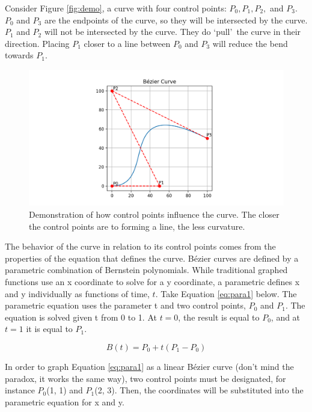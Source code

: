 \documentclass[12pt,letterpaper]{article}
\begin{document}
Consider Figure \ref{fig:demo}, a curve with four control points: $P_0, P_1, P_2,$ and $P_3$. $P_0$ and $P_3$ are the endpoints of the curve, so they will be intersected by the curve. $P_1$ and $P_2$ will not be intersected by the curve. They do \lq pull\rq \, the curve in their direction. Placing $P_1$ closer to a line between $P_0$ and $P_3$ will reduce the bend towards $P_1$.

\begin{figure}[H]
    \includegraphics[width=15cm]{Figure_2}
    \centering
    \caption{Demonstration of how control points influence the curve. The closer the control points are to forming a line, the less curvature.}
    \label{fig:demo2}
\end{figure}

The behavior of the curve in relation to its control points comes from the properties of the equation that defines the curve. B\'ezier curves are defined by a parametric combination of Bernstein polynomials. While traditional graphed functions use an x coordinate to solve for a y coordinate, a parametric defines x and y individually as functions of time, $t$. 
Take Equation \ref{eq:para1} below. The parametric equation uses the parameter t and two control points, $P_0$ and $P_1$. The equation is solved given t from 0 to 1. At $t=0$, the result is equal to $P_0$, and at $t=1$ it is equal to $P_1$.

\begin{equation}
    \label{eq:para1}
    B(t) = P_0 + t(P_1 - P_0)
\end{equation}

In order to graph Equation \ref{eq:para1} as a linear B\'ezier curve (don’t mind the paradox, it works the same way), two control points must be designated, for instance $P_0$(1, 1) and $P_1$(2, 3). Then, the coordinates will be substituted into the parametric equation for x and y.
\end{document}
